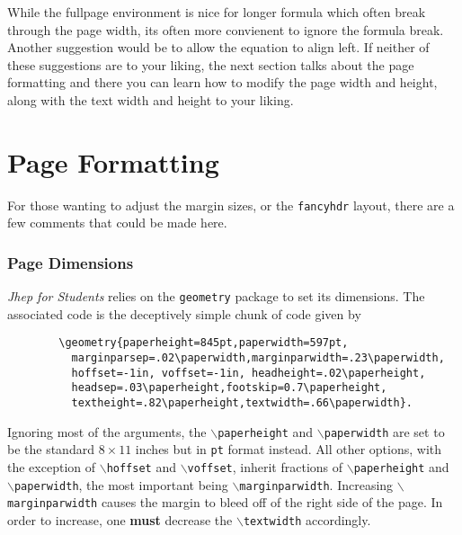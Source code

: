 \documentclass[10pt]{article}
\begin{document}
	While the fullpage environment is nice for longer formula which often break through the page width, its often more convienent to ignore the formula break. Another suggestion would be to allow the equation to align left. If neither of these suggestions are to your liking, the next section talks about the page formatting and there you can learn how to modify the page width and height, along with the text width and height to your liking.

	\newpage

	\part{Page Formatting}
	For those wanting to adjust the margin sizes, or the \texttt{fancyhdr} layout, there are a few comments that could be made here.
	\section{Page Dimensions}
	\textit{Jhep for Students} relies on the \texttt{geometry} package to set its dimensions. The associated code is the deceptively simple chunk of code given by
	\begin{verbatim}
		\geometry{paperheight=845pt,paperwidth=597pt,
          marginparsep=.02\paperwidth,marginparwidth=.23\paperwidth,
          hoffset=-1in, voffset=-1in, headheight=.02\paperheight,
          headsep=.03\paperheight,footskip=0.7\paperheight,
          textheight=.82\paperheight,textwidth=.66\paperwidth}.
	\end{verbatim}
	Ignoring most of the arguments, the \texttt{$\backslash$paperheight} and \texttt{$\backslash$paperwidth} are set to be the standard $8\times11$ inches but in \texttt{pt} format instead. All other options, with the exception of \texttt{$\backslash$hoffset} and \texttt{$\backslash$voffset}, inherit fractions of \texttt{$\backslash$paperheight} and \texttt{$\backslash$paperwidth}, the most important being \texttt{$\backslash$marginparwidth}. Increasing \texttt{$\backslash$marginparwidth} causes the margin to bleed off of the right side of the page. In order to increase, one \textbf{must} decrease the \texttt{$\backslash$textwidth} accordingly.
\end{document}
